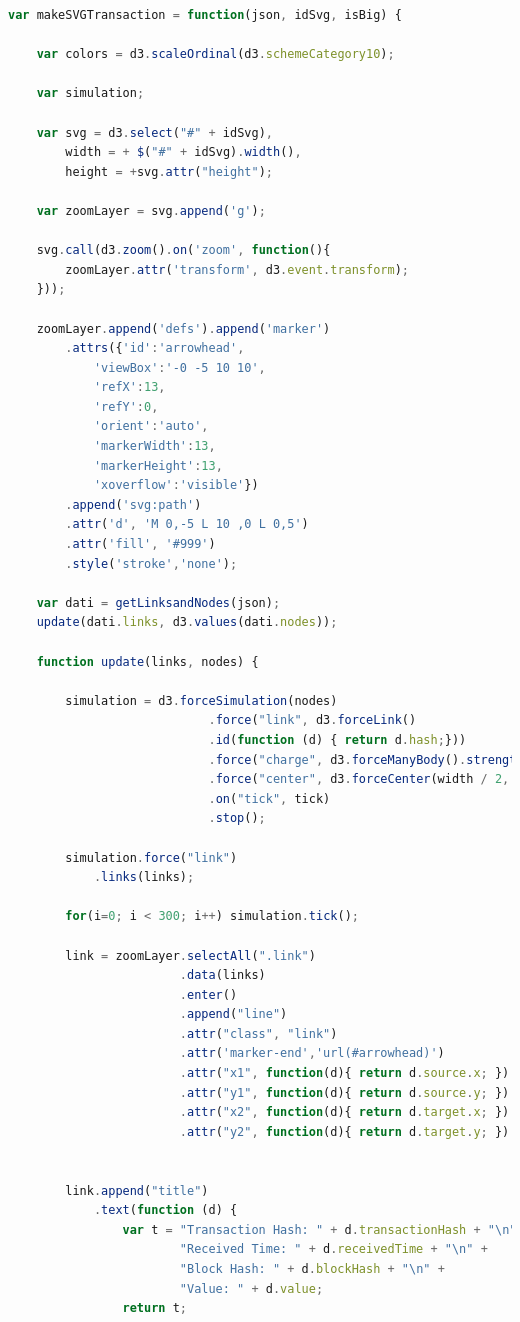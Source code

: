 \begin{itemize}
\begin{lstlisting}[language=Javascript, label=lst:makeGraph, caption={Funzione per grafi.}]
var makeSVGTransaction = function(json, idSvg, isBig) {

    var colors = d3.scaleOrdinal(d3.schemeCategory10);

    var simulation;

    var svg = d3.select("#" + idSvg),
        width = + $("#" + idSvg).width(),
        height = +svg.attr("height");

    var zoomLayer = svg.append('g');

    svg.call(d3.zoom().on('zoom', function(){
        zoomLayer.attr('transform', d3.event.transform);
    }));

    zoomLayer.append('defs').append('marker')
        .attrs({'id':'arrowhead',
            'viewBox':'-0 -5 10 10',
            'refX':13,
            'refY':0,
            'orient':'auto',
            'markerWidth':13,
            'markerHeight':13,
            'xoverflow':'visible'})
        .append('svg:path')
        .attr('d', 'M 0,-5 L 10 ,0 L 0,5')
        .attr('fill', '#999')
        .style('stroke','none');

    var dati = getLinksandNodes(json);
    update(dati.links, d3.values(dati.nodes));

    function update(links, nodes) {

        simulation = d3.forceSimulation(nodes)
                            .force("link", d3.forceLink()
                            .id(function (d) { return d.hash;}))
                            .force("charge", d3.forceManyBody().strength(-80))
                            .force("center", d3.forceCenter(width / 2, height / 2))
                            .on("tick", tick)
                            .stop();

        simulation.force("link")
            .links(links);

        for(i=0; i < 300; i++) simulation.tick();

        link = zoomLayer.selectAll(".link")
                        .data(links)
                        .enter()
                        .append("line")
                        .attr("class", "link")
                        .attr('marker-end','url(#arrowhead)')
                        .attr("x1", function(d){ return d.source.x; })
                        .attr("y1", function(d){ return d.source.y; })
                        .attr("x2", function(d){ return d.target.x; })
                        .attr("y2", function(d){ return d.target.y; })


        link.append("title")
            .text(function (d) {
                var t = "Transaction Hash: " + d.transactionHash + "\n" +
                        "Received Time: " + d.receivedTime + "\n" +
                        "Block Hash: " + d.blockHash + "\n" +
                        "Value: " + d.value;
                return t;


\end{lstlisting}
\end{itemize}
